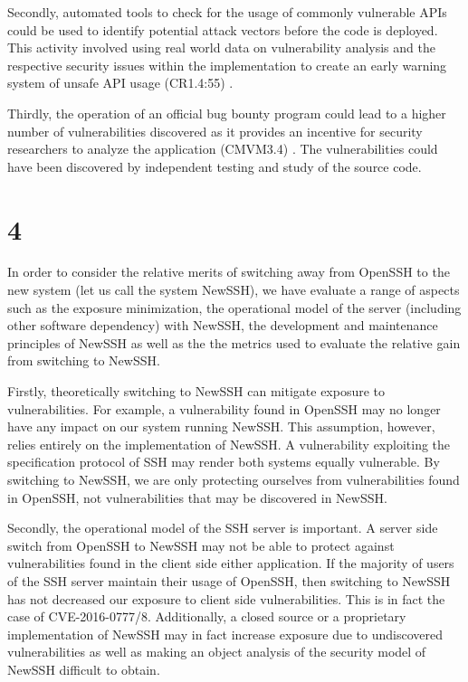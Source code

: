 \documentclass[a4paper, 12pt]{article}
\begin{document}
Secondly, automated tools to check for the usage of commonly vulnerable APIs could be used to identify potential attack vectors before the code is deployed. This activity involved using real world data on vulnerability analysis and the respective security issues within the implementation to create an early warning system of unsafe API usage (CR1.4:55) \cite{BSIMM6-CodeReview}.

Thirdly, the operation of an official bug bounty program could lead to a higher number of vulnerabilities discovered as it provides an incentive for security researchers to analyze the application (CMVM3.4) \cite{BSIMM6-BugBounty}. The vulnerabilities could have been discovered by independent testing and study of the source code. 

\setcounter{section}{3}
\section*{4}
In order to consider the relative merits of switching away from OpenSSH to the new system (let us call the system NewSSH), we have evaluate a range of aspects such as the exposure minimization, the operational model of the server (including other software dependency) with NewSSH, the development and maintenance principles of NewSSH as well as the the metrics used to evaluate the relative gain from switching to NewSSH.

Firstly, theoretically switching to NewSSH can mitigate exposure to vulnerabilities. For example, a vulnerability found in OpenSSH may no longer have any impact on our system running NewSSH. This assumption, however, relies entirely on the implementation of NewSSH. A vulnerability exploiting the specification protocol of SSH may render both systems equally vulnerable. By switching to NewSSH, we are only protecting ourselves from vulnerabilities found in OpenSSH, not vulnerabilities that may be discovered in NewSSH.

Secondly, the operational model of the SSH server is important. A server side switch from OpenSSH to NewSSH may not be able to protect against vulnerabilities found in the client side either application. If the majority of users of the SSH server maintain their usage of OpenSSH, then switching to NewSSH has not decreased our exposure to client side vulnerabilities. This is in fact the case of CVE-2016-0777/8. Additionally, a closed source or a proprietary implementation of NewSSH may in fact increase exposure due to undiscovered vulnerabilities as well as making an object analysis of the security model of NewSSH difficult to obtain.
\end{document}
